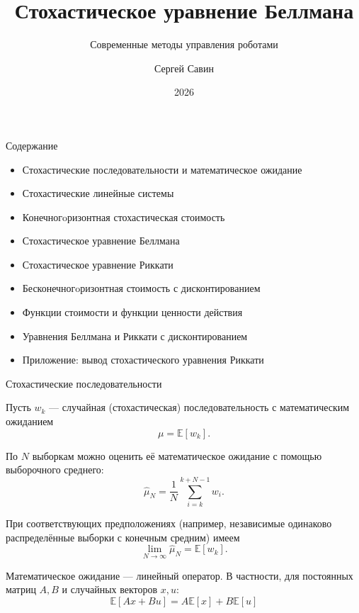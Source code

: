 \documentclass{beamer}
\subtitle{Современные методы управления роботами}
\author{Сергей Савин}
\date{2026}
\title{Стохастическое уравнение Беллмана}
\begin{document}
	\maketitle
	
	
	\begin{frame}{Содержание}
		\begin{itemize}
			\item Стохастические последовательности и математическое ожидание
			\item Стохастические линейные системы
			\item Конечногoризонтная стохастическая стоимость
			\item Стохастическое уравнение Беллмана
			\item Стохастическое уравнение Риккати
			\item Бесконечногoризонтная стоимость с дисконтированием
			\item Функции стоимости и функции ценности действия
			\item Уравнения Беллмана и Риккати с дисконтированием
			\item Приложение: вывод стохастического уравнения Риккати
		\end{itemize}
	\end{frame}
	
	
	
	\begin{frame}{Стохастические последовательности}
		\begin{flushleft}
			
			{\small 
			Пусть $w_k$ — случайная (стохастическая) последовательность с математическим ожиданием
			\[
			\mu = \mathbb{E}[w_k].
			\]
			
			По $N$ выборкам можно оценить её математическое ожидание с помощью выборочного среднего:
			\[
			\hat{\mu}_N = \frac{1}{N}\sum_{i=k}^{k+N-1} w_i.
			\]
			
			При соответствующих предположениях (например, независимые одинаково распределённые
			выборки с конечным средним) имеем
			\[
			\lim_{N\to\infty}\hat{\mu}_N = \mathbb{E}[w_k].
			\]
			
			
			Математическое ожидание — линейный оператор. В частности, для постоянных матриц
			$A,B$ и случайных векторов $x,u$:
			\[
			\boxed{
				\mathbb{E}[Ax+Bu]
				= A\mathbb{E}[x]+B\mathbb{E}[u]
			}
			\]
		}
		\end{flushleft}
	\end{frame}
	
\end{document}
